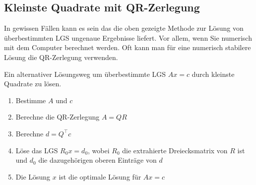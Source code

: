 \subsection{Kleinste Quadrate mit QR-Zerlegung}

In gewissen Fällen kann es sein das die oben gezeigte Methode zur Lösung von überbestimmten LGS ungenaue Ergebnisse liefert. Vor allem, wenn Sie numerisch mit dem Computer berechnet werden. Oft kann man für eine numerisch stabilere Lösung die QR-Zerlegung verwenden. 

\begin{tcolorbox}[colback=gray!30, colframe=gray!80, title=Kleinste Quadrate mit QR-Zerlegung]
    Ein alternativer Lösungsweg um überbestimmte LGS \( Ax=c\) durch kleinste Quadrate zu lösen. 
    \begin{enumerate}
        \item Bestimme \( A \) und \( c \)
        \item Berechne die QR-Zerlegung \( A = QR \)
        \item Berechne \( d = Q^\top c \)
        \item Löse das LGS \( R_0 x = d_0 \), wobei \( R_0 \) die extrahierte Dreiecksmatrix von \( R \) ist und \( d_0 \) die dazugehörigen oberen Einträge von \( d \)
        \item Die Lösung \( x \) ist die optimale Lösung für \( Ax = c \)
    \end{enumerate}
\end{tcolorbox}